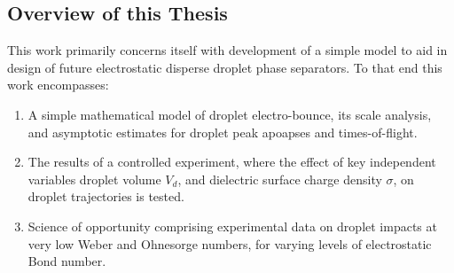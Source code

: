 \documentclass[10pt,a4paper]{article}
\begin{document}
\subsection{Overview of this Thesis}
This work primarily concerns itself with development of a simple model to aid in design of future electrostatic disperse droplet phase separators. To that end this work encompasses:
\begin{enumerate}
\item A simple mathematical model of droplet electro-bounce, its scale analysis, and asymptotic estimates for droplet peak apoapses and times-of-flight.
\item The results of a controlled experiment, where the effect of key independent variables droplet volume $V_d$, and dielectric surface charge density $\sigma$, on droplet trajectories is tested.
\item Science of opportunity comprising experimental data on droplet impacts at very low Weber and Ohnesorge numbers, for varying levels of electrostatic Bond number. 
\end{enumerate}

\printbibliography
\end{document}
